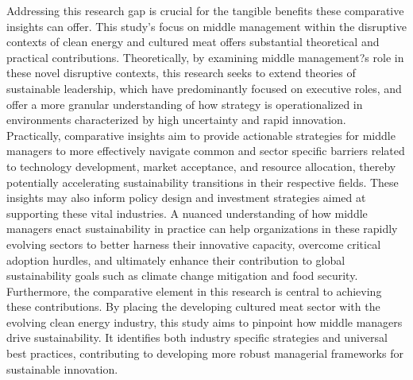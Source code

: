 Addressing this research gap is crucial for the tangible benefits these comparative insights can offer. This study's focus on middle management within the disruptive contexts of clean energy and cultured meat offers substantial theoretical and practical contributions. Theoretically, by examining middle management?s role in these novel disruptive contexts, this research seeks to extend theories of sustainable leadership, which have predominantly focused on executive roles, and offer a more granular understanding of how strategy is operationalized in environments characterized by high uncertainty and rapid innovation. \\

Practically, comparative insights aim to provide actionable strategies for middle managers to more effectively navigate common and sector specific barriers related to technology development, market acceptance, and resource allocation, thereby potentially accelerating sustainability transitions in their respective fields. These insights may also inform policy design and investment strategies aimed at supporting these vital industries. A nuanced understanding of how middle managers enact sustainability in practice can help organizations in these rapidly evolving sectors to better harness their innovative capacity, overcome critical adoption hurdles, and ultimately enhance their contribution to global sustainability goals such as climate change mitigation and food security. \\

Furthermore, the comparative element in this research is central to achieving these contributions. By placing the developing cultured meat sector with the evolving clean energy industry, this study aims to pinpoint how middle managers drive sustainability. It identifies both industry specific strategies and universal best practices, contributing to developing more robust managerial frameworks for sustainable innovation. \\
